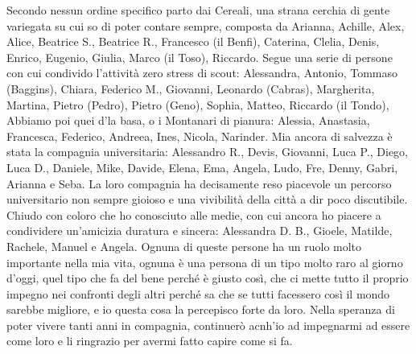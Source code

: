Secondo nessun ordine specifico parto dai Cereali, una strana cerchia di gente variegata su cui so di poter contare sempre, composta da Arianna, Achille, Alex, Alice, Beatrice S., Beatrice R., Francesco (il Benfi), Caterina, Clelia, Denis, Enrico, Eugenio, Giulia, Marco (il Toso), Riccardo.
Segue una serie di persone con cui condivido l'attività zero stress di scout: Alessandra, Antonio, Tommaso (Baggins), Chiara, Federico M., Giovanni, Leonardo (Cabras), Margherita, Martina, Pietro (Pedro), Pietro (Geno), Sophia, Matteo, Riccardo (il Tondo),
Abbiamo poi quei d'la basa, o i Montanari di pianura: Alessia, Anastasia, Francesca, Federico, Andreea, Ines, Nicola, Narinder.
Mia ancora di salvezza è stata la compagnia universitaria: Alessandro R., Devis, Giovanni, Luca P., Diego, Luca D., Daniele, Mike, Davide, Elena, Ema, Angela, Ludo, Fre, Denny, Gabri, Arianna e Seba. La loro compagnia ha decisamente reso piacevole un percorso universitario non sempre gioioso e una vivibilità della città a dir poco discutibile.
Chiudo con coloro che ho conosciuto alle medie, con cui ancora ho piacere a condividere un'amicizia duratura e sincera: Alessandra D. B., Gioele, Matilde, Rachele, Manuel e Angela.
Ognuna di queste persone ha un ruolo molto importante nella mia vita, ognuna è una persona di un tipo molto raro al giorno d'oggi, quel tipo che fa del bene perché è giusto così, che ci mette tutto il proprio impegno nei confronti degli altri perché sa che se tutti facessero così il mondo sarebbe migliore, e io questa cosa la percepisco forte da loro. Nella speranza di poter vivere tanti anni in compagnia, continuerò acnh'io ad impegnarmi ad essere come loro e li ringrazio per avermi fatto capire come si fa.
